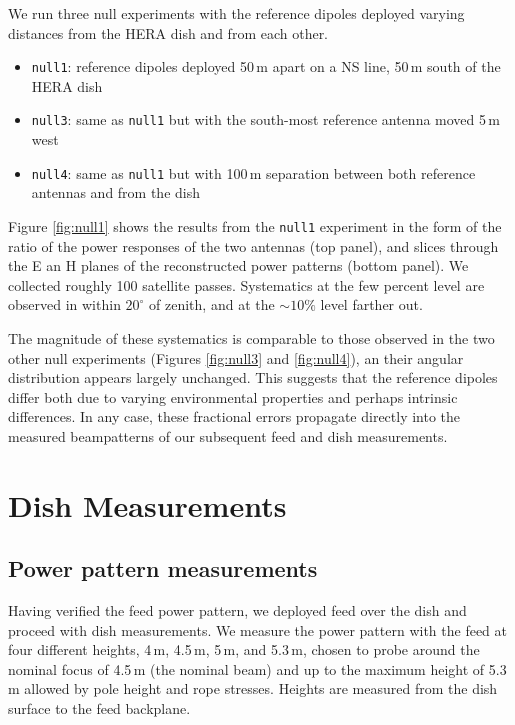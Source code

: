 \documentclass{emulateapj}
\begin{document}
We run three null experiments with the reference dipoles deployed varying distances from the HERA dish and from each other.

\begin{itemize}
\item \texttt{null1}: reference dipoles deployed 50\,m apart on a NS line, 50\,m south of the HERA dish
\item \texttt{null3}: same as \texttt{null1} but with the south-most reference antenna moved 5\,m west
\item \texttt{null4}: same as \texttt{null1} but with 100\,m separation between both reference antennas and from the dish
\end{itemize}

Figure \ref{fig:null1} shows the  results from the \texttt{null1} experiment in the form of the ratio of the power responses of the two antennas (top panel), and slices through the E an H planes of the reconstructed power patterns (bottom panel). We collected roughly 100 satellite passes. Systematics at the few percent level are observed in  within $20^\circ$ of zenith, and at the $\sim10\%$ level farther out.

The magnitude of these systematics is comparable to those observed in the two other null experiments (Figures \ref{fig:null3} and \ref{fig:null4}), an their angular distribution appears largely unchanged. This suggests that the reference dipoles differ both due to varying environmental properties and perhaps intrinsic differences. In any case, these fractional errors propagate directly into the measured beampatterns of our subsequent feed and dish measurements.  


\section{Dish Measurements}

\subsection{Power pattern measurements}

Having verified the feed power pattern, we deployed feed over the dish and proceed with dish measurements. We measure the power pattern with the feed at four different heights, 4\,m, 4.5\,m, 5\,m, and 5.3\,m, chosen to probe around the nominal focus of 4.5\,m (the nominal beam) and up to the maximum height of 5.3\,m allowed by pole height and rope stresses. Heights are measured from the dish surface to the feed backplane. 
\end{document}
